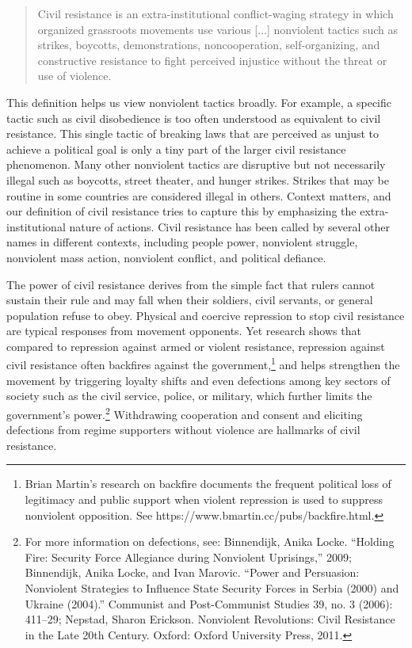 \documentclass[twoside,a4paper,12pt,fleqn,openany]{extbook}
\begin{document}
\begin{quote}
Civil resistance is an extra-institutional conflict-waging strategy in which organized grassroots movements use various [...] nonviolent tactics such as strikes, boycotts, demonstrations, noncooperation, self-organizing, and constructive resistance to fight perceived injustice without the threat or use of violence.
\end{quote}

This definition helps us view nonviolent tactics broadly. For example, a specific tactic such as civil disobedience is too often understood as equivalent to civil resistance. This single tactic of breaking laws that are perceived as unjust to achieve a political goal is only a tiny part of the larger civil resistance phenomenon. Many other nonviolent tactics are disruptive but not necessarily illegal such as boycotts, street theater, and hunger strikes. Strikes that may be routine in some countries are considered illegal in others. Context matters, and our definition of civil resistance tries to capture this by emphasizing the extra-institutional nature of actions. Civil resistance has been called by several other names in different contexts, including people power, nonviolent struggle, nonviolent mass action, nonviolent conflict, and
political defiance.

The power of civil resistance derives from the simple fact that rulers cannot sustain their rule and may fall when their soldiers, civil servants, or general population refuse to obey. Physical and coercive repression to stop civil resistance are typical responses from movement opponents. Yet research shows that compared to repression against armed or violent resistance, repression against civil resistance often backfires against the government,\footnote{Brian Martin’s research on backfire documents the frequent political loss of legitimacy and public support when violent repression is used to suppress nonviolent opposition. See https://www.bmartin.cc/pubs/backfire.html.} and helps strengthen the movement by triggering loyalty shifts and even defections among key sectors of society such as the civil service, police, or military, which further limits the government’s power.\footnote{For more information on defections, see: Binnendijk, Anika Locke. “Holding Fire: Security Force Allegiance during Nonviolent Uprisings,” 2009; Binnendijk, Anika Locke, and Ivan Marovic. “Power and Persuasion: Nonviolent Strategies to Influence State Security Forces in Serbia (2000) and Ukraine (2004).” Communist and Post-Communist Studies 39, no. 3 (2006): 411–29; Nepstad, Sharon Erickson. Nonviolent Revolutions: Civil Resistance in the Late 20th Century. Oxford: Oxford University Press, 2011.} Withdrawing cooperation and consent and eliciting defections from regime supporters without violence are hallmarks of civil resistance.
\end{document}

